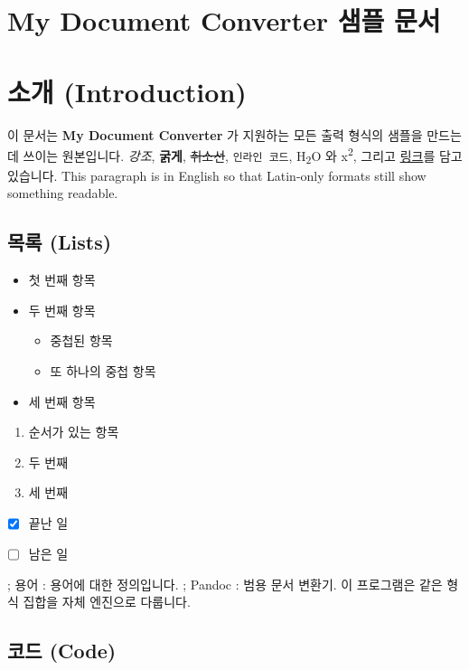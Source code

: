 \documentclass[11pt]{article}
\date{}
\begin{document}
\section*{My Document Converter 샘플 문서}\label{my-document-converter-샘플-문서}

\section*{소개 (Introduction)}\label{소개-introduction}

이 문서는 \textbf{My Document Converter} 가 지원하는 모든 출력 형식의 샘플을 만드는 데 쓰이는
원본입니다. \emph{강조}, \textbf{굵게}, \sout{취소선}, \verb|인라인 코드|,
H\textsubscript{2}O 와 x\textsuperscript{2}, 그리고
\href{https://example.com}{링크}를 담고 있습니다. This paragraph is in English so
that Latin-only formats still show something readable.

\subsection*{목록 (Lists)}\label{목록-lists}

\begin{itemize}
\item 첫 번째 항목
\item 두 번째 항목
\begin{itemize}
\item 중첩된 항목
\item 또 하나의 중첩 항목
\end{itemize}
\item 세 번째 항목
\end{itemize}

\begin{enumerate}
\item 순서가 있는 항목
\item 두 번째
\item 세 번째
\end{enumerate}

\begin{itemize}
\item ☒ 끝난 일
\item ☐ 남은 일
\end{itemize}

; 용어
: 용어에 대한 정의입니다.
; Pandoc
: 범용 문서 변환기. 이 프로그램은 같은 형식 집합을 자체 엔진으로 다룹니다.

\subsection*{코드 (Code)}\label{코드-code}
\end{document}
